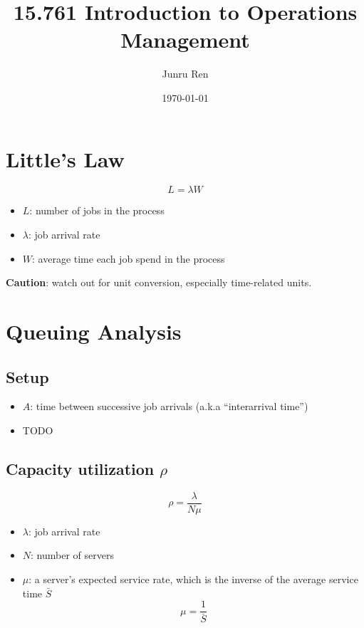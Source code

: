 \documentclass[11pt]{article}
\title{ 15.761 Introduction to Operations Management }
\author{ Junru Ren }
\date{\today}
\begin{document}
\maketitle	

\section{Little's Law}

\begin{equation}
    L = \lambda W
\end{equation}

\begin{itemize}
    \item $L$: number of jobs in the process
    \item $\lambda$: job arrival rate
    \item $W$: average time each job spend in the process
\end{itemize}

\textbf{Caution}: watch out for unit conversion, especially time-related units.

\section{Queuing Analysis}

\subsection{Setup}

\begin{itemize}
    \item $A$: time between successive job arrivals (a.k.a ``interarrival time'')
    \item TODO
\end{itemize}

\subsection{Capacity utilization $\rho$}

\begin{equation}
    \rho = \frac{\lambda}{N \mu}
\end{equation}

\begin{itemize}
    \item $\lambda$: job arrival rate
    \item $N$: number of servers
    \item $\mu$: a server's expected service rate, which is the inverse of the average service time $\bar{S}$ \begin{equation}
        \mu = \frac{1}{\bar{S}}
    \end{equation}
\end{itemize}
\end{document}

